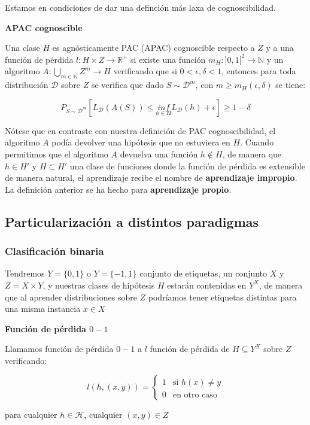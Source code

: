Estamos en condiciones de dar una definción más laxa de cognoscibilidad.

\begin{definition*} \textbf{APAC cognoscible}

Una clase $H$ es agnósticamente PAC (APAC) cognoscible respecto a $Z$ y a una función de pérdida 
$l: H \times Z \rightarrow \mathbb{R}^{+}$ si existe una función 
$m_{H} : ]0,1[^2\rightarrow \mathbb{N}$ y un algoritmo 
$A: \underset{m\in \mathbb{N}}{\bigcup} Z^m \rightarrow H$ verificando que si 
$0 < \epsilon, \delta < 1$, entonces para toda distribución $\mathcal{D}$ sobre $Z$ se verifica
que dado $S\sim \mathcal{D}^m$, con $m\ge m_{H}(\epsilon, \delta)$ se tiene:

\[P_{S\sim \mathcal{D}^m}[L_{\mathcal{D}}(A(S)) \le \underset{h\in H}{inf} L_{\mathcal{D}}(h) + \epsilon] \ge 1-\delta\]
\end{definition*}

Nótese que en contraste con nuestra definición de PAC cognoscibilidad, el algoritmo $A$ podía devolver una 
hipótesis que no estuviera en $H$. Cuando permitimos que el algoritmo $A$ devuelva una función 
$h \notin H$, de manera que $h \in H'$ y  $H \subset H'$ una clase de funciones donde la función de pérdida 
es extensible de manera natural, el aprendizaje recibe el nombre de \textbf{aprendizaje impropio}. La definición 
anterior se ha hecho para \textbf{aprendizaje propio}.


\subsection{Particularización a distintos paradigmas}

\subsubsection{Clasificación binaria}

Tendremos $Y=\{0,1\}$ o $Y=\{-1,1\}$ conjunto de etiquetas, un conjunto $X$ y $Z=X\times Y$, y nuestras clases
de hipótesis $H$ estarán contenidas en $Y^X$, de manera que al aprender distribuciones sobre $Z$ podríamos 
tener etiquetas distintas para una misma instancia $x \in X$

\begin{definition*} \textbf{Función de pérdida $0-1$}

Llamamos función de pérdida $0-1$ a $l$ función de pérdida de $H\subseteq Y^X$ sobre $Z$ verificando:
 
 \[l(h, (x,y)) = \left\{\begin{array}{ll}
                         1 & \textrm{si } h(x)\neq y\\
                         0 & \textrm{en otro caso}
                        \end{array}\right.\]

para cualquier $h\in \mathcal{H}$, cualquier $(x,y) \in Z$

\label{def:l01}
\end{definition*}

